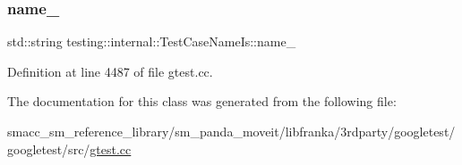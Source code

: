 \subsubsection{\texorpdfstring{name\+\_\+}{name\_}}
{\footnotesize\ttfamily std\+::string testing\+::internal\+::\+Test\+Case\+Name\+Is\+::name\+\_\+\hspace{0.3cm}{\ttfamily [private]}}



Definition at line 4487 of file gtest.\+cc.



The documentation for this class was generated from the following file\+:\begin{DoxyCompactItemize}
\item 
smacc\+\_\+sm\+\_\+reference\+\_\+library/sm\+\_\+panda\+\_\+moveit/libfranka/3rdparty/googletest/googletest/src/\hyperlink{gtest_8cc}{gtest.\+cc}\end{DoxyCompactItemize}
